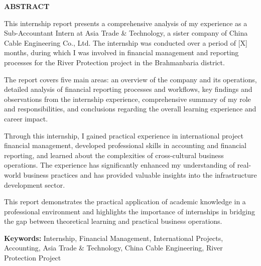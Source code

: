 \vspace*{0.5cm}
{\Huge \textbf{ABSTRACT}}

\vspace{0.5cm}
\begin{minipage}{0.9\textwidth}
    \large
    This internship report presents a comprehensive analysis of my experience as a Sub-Accountant Intern at Asia Trade \& Technology, a sister company of China Cable Engineering Co., Ltd. The internship was conducted over a period of [X] months, during which I was involved in financial management and reporting processes for the River Protection project in the Brahmanbaria district.
    
    \vspace{0.5cm}
    The report covers five main areas: an overview of the company and its operations, detailed analysis of financial reporting processes and workflows, key findings and observations from the internship experience, comprehensive summary of my role and responsibilities, and conclusions regarding the overall learning experience and career impact.
    
    \vspace{0.5cm}
    Through this internship, I gained practical experience in international project financial management, developed professional skills in accounting and financial reporting, and learned about the complexities of cross-cultural business operations. The experience has significantly enhanced my understanding of real-world business practices and has provided valuable insights into the infrastructure development sector.
    
    \vspace{0.5cm}
    This report demonstrates the practical application of academic knowledge in a professional environment and highlights the importance of internships in bridging the gap between theoretical learning and practical business operations.
    
    \vspace{0.5cm}
    \textbf{Keywords:} Internship, Financial Management, International Projects, Accounting, Asia Trade \& Technology, China Cable Engineering, River Protection Project
\end{minipage}
\par\endgroup
